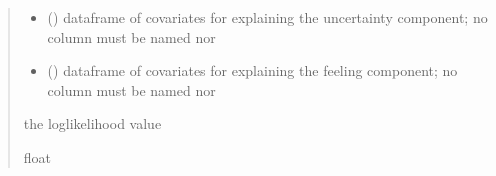 \documentclass[letterpaper,10pt,english]{sphinxmanual}
\begin{document}
\begin{fulllineitems}
\begin{quote}
\begin{description}
\begin{itemize}
\item {} 
\sphinxAtStartPar
{} () \textendash{} dataframe of covariates for explaining the uncertainty component;
no column must be named  nor 

\item {} 
\sphinxAtStartPar
{} () \textendash{} dataframe of covariates for explaining the feeling component;
no column must be named  nor 

\end{itemize}

\sphinxAtStartPar
the log\sphinxhyphen{}likelihood value

\sphinxAtStartPar
float

\end{description}\end{quote}

\end{fulllineitems}

\end{document}

